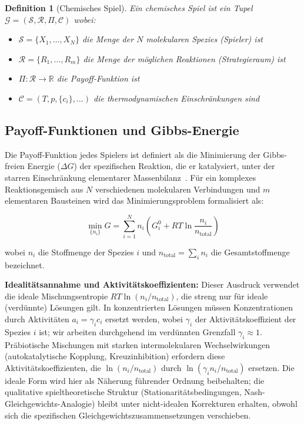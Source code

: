\documentclass[12pt,a4paper]{article}
\newtheorem{definition}{Definition}
\theoremstyle{remark}
\begin{document}
\begin{definition}[Chemisches Spiel]
Ein chemisches Spiel ist ein Tupel $\mathcal{G} = (\mathcal{S}, \mathcal{R}, \Pi, \mathcal{C})$ wobei:
\begin{itemize}
    \item $\mathcal{S} = \{X_1, \ldots, X_N\}$ die Menge der $N$ molekularen Spezies (Spieler) ist
    \item $\mathcal{R} = \{R_1, \ldots, R_m\}$ die Menge der möglichen Reaktionen (Strategieraum) ist
    \item $\Pi: \mathcal{R} \to \mathbb{R}$ die Payoff-Funktion ist
    \item $\mathcal{C} = (T, p, \{c_i\}, \ldots)$ die thermodynamischen Einschränkungen sind
\end{itemize}
\end{definition}

\subsection{Payoff-Funktionen und Gibbs-Energie}

Die Payoff-Funktion jedes Spielers ist definiert als die Minimierung der Gibbs-freien Energie ($\Delta G$) der spezifischen Reaktion, die er katalysiert, unter der starren Einschränkung elementarer Massenbilanz~\citep{MetabolicNash}. Für ein komplexes Reaktionsgemisch aus $N$ verschiedenen molekularen Verbindungen und $m$ elementaren Bausteinen wird das Minimierungsproblem formalisiert als:

\begin{equation}
\min_{\{n_i\}} G = \sum_{i=1}^{N} n_i \left( G_i^0 + RT \ln\frac{n_i}{n_{\mathrm{total}}} \right)
\end{equation}

\noindent
wobei $n_i$ die Stoffmenge der Spezies $i$ und $n_{\mathrm{total}} = \sum_i n_i$ die Gesamtstoffmenge bezeichnet.

\noindent
\textbf{Idealitätsannahme und Aktivitätskoeffizienten:} Dieser Ausdruck verwendet die ideale Mischungsentropie $RT\ln(n_i/n_{\mathrm{total}})$, die streng nur für ideale (verdünnte) Lösungen gilt. In konzentrierten Lösungen müssen Konzentrationen durch Aktivitäten $a_i = \gamma_i c_i$ ersetzt werden, wobei $\gamma_i$ der Aktivitätskoeffizient der Spezies $i$ ist; wir arbeiten durchgehend im verdünnten Grenzfall $\gamma_i \approx 1$. Präbiotische Mischungen mit starken intermolekularen Wechselwirkungen (autokatalytische Kopplung, Kreuzinhibition) erfordern diese Aktivitätskoeffizienten, die $\ln(n_i/n_{\mathrm{total}})$ durch $\ln(\gamma_i n_i/n_{\mathrm{total}})$ ersetzen. Die ideale Form wird hier als Näherung führender Ordnung beibehalten; die qualitative spieltheoretische Struktur (Stationaritätsbedingungen, Nash-Gleichgewichts-Analogie) bleibt unter nicht-idealen Korrekturen erhalten, obwohl sich die spezifischen Gleichgewichtszusammensetzungen verschieben.
\end{document}
